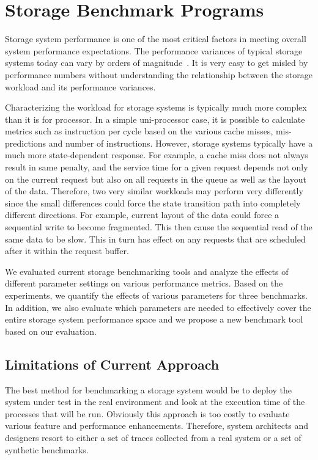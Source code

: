 \chapter{Storage Benchmark Programs}
\label{BENCH}

Storage system performance is one of the most critical factors in meeting overall system performance expectations. 
The performance variances of typical storage systems today can vary by orders of magnitude~\cite{chen:1993}. 
It is very easy to get misled by performance numbers without understanding the relationship between the storage workload and its performance variances. 

Characterizing the workload for storage systems is typically much more complex than it is for processor. 
In a simple uni-processor case, it is possible to calculate metrics such as instruction per cycle based on the various cache misses, mis-predictions and number of instructions. 
However, storage systems typically have a much more state-dependent response. 
For example, a cache miss does not always result in same penalty, and the service time for a given request depends not only on the  current request but also on all requests in the queue as well as the layout of the data. 
Therefore, two very similar workloads may perform very differently since the small differences could force the state transition path into completely different directions. 
For example, current layout of the data could force a sequential write to become fragmented. 
This then cause the sequential read of the same data to be slow. 
This in turn has effect on any requests that are scheduled after it within the request buffer.

We evaluated current storage benchmarking tools and analyze the effects of different parameter settings on various performance metrics. 
Based on the experiments, we quantify the effects of various parameters for three benchmarks. 
In addition, we also evaluate which parameters are needed to effectively cover the entire storage system performance space and we propose a new benchmark tool based on our evaluation.

\section{Limitations of Current Approach}
The best method for benchmarking a storage system would be to deploy the system under test in the real environment and look at the execution time of the processes that will be run. 
Obviously this approach is too costly to evaluate various feature and performance enhancements. 
Therefore, system architects and designers resort to either a set of traces collected from a real system or a set of synthetic benchmarks.


